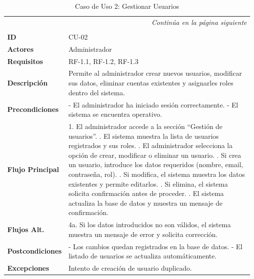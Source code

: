 \clearpage
\begin{longtable}{p{} p{}}
    \toprule
    \endfirsthead
    \toprule
    \endhead
    \midrule
    \multicolumn{2}{r}{\small\itshape Continúa en la página siguiente} \\
    \endfoot
    \bottomrule
    \noalign{\vspace{0.5cm}}
    \caption{Caso de Uso 2: Gestionar Usuarios} \label{cu:2} \\
    \endlastfoot

    \textbf{ID} & CU-02 \\ \midrule
    \textbf{Actores} & Administrador \\ \midrule
    \textbf{Requisitos} & RF-1.1, RF-1.2, RF-1.3 \\ \midrule
    \textbf{Descripción} & Permite al administrador crear nuevos usuarios, modificar sus datos, eliminar cuentas existentes y asignarles roles dentro del sistema. \\ \midrule
    \textbf{Precondiciones} & 
    - El administrador ha iniciado sesión correctamente. \newline
    - El sistema se encuentra operativo. \\ \midrule
    \textbf{Flujo Principal} & 
    1. El administrador accede a la sección “Gestión de usuarios”. \newline
    2. El sistema muestra la lista de usuarios registrados y sus roles. \newline
    3. El administrador selecciona la opción de crear, modificar o eliminar un usuario. \newline
    4. Si crea un usuario, introduce los datos requeridos (nombre, email, contraseña, rol). \newline
    5. Si modifica, el sistema muestra los datos existentes y permite editarlos. \newline
    6. Si elimina, el sistema solicita confirmación antes de proceder. \newline
    7. El sistema actualiza la base de datos y muestra un mensaje de confirmación. \\ \midrule
    \textbf{Flujos Alt.} & 
    4a. Si los datos introducidos no son válidos, el sistema muestra un mensaje de error y solicita corrección. \\ \midrule
    \textbf{Postcondiciones} & 
    - Los cambios quedan registrados en la base de datos. \newline
    - El listado de usuarios se actualiza automáticamente. \\ \midrule
    \textbf{Excepciones} & Intento de creación de usuario duplicado. \\
\end{longtable}

